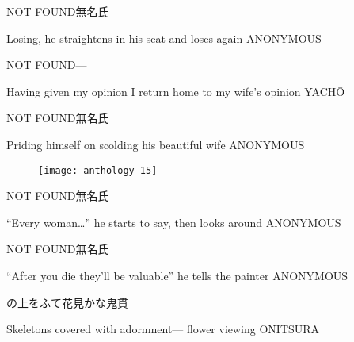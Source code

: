 \begin{haiku}
    NOT FOUND\hfill{\FH 無名氏}

    \vin{} Losing,
    \vin{} \vin{} he straightens in his seat
    \vin{} \vin{} \vin{} and loses again \hspace{\fill} ANONYMOUS
\end{haiku}

\begin{haiku}
   NOT FOUND\hfill{---}

    \vin{} Having given my opinion
    \vin{} \vin{} I return home to
    \vin{} \vin{} \vin{} my wife's opinion \hspace{\fill} YACH\={O}
\end{haiku}

\begin{haiku}
    NOT FOUND\hfill{\FH 無名氏}

    \vin{} Priding himself
    \vin{} \vin{} on scolding
    \vin{} \vin{} \vin{} his beautiful wife \hspace{\fill} ANONYMOUS
\end{haiku}

\begin{figure}
    \texttt{[image: anthology-15]}
\end{figure}

\begin{haiku}
    NOT FOUND\hfill{\FH 無名氏}

    \vin{} ``Every woman\ldots''
    \vin{} \vin{} he starts to say,
    \vin{} \vin{} \vin{} then looks around \hspace{\fill} ANONYMOUS
\end{haiku}

\begin{haiku}
    NOT FOUND\hfill{\FH 無名氏}

    \vin{} ``After you die
    \vin{} \vin{} they'll be valuable''
    \vin{} \vin{} \vin{} he tells the painter \hspace{\fill} ANONYMOUS
\end{haiku}

\begin{haiku}
    {\FH {}の上をふて花見かな}\hfill{\FH 鬼貫}

    \vin{} Skeletons
    \vin{} \vin{} covered with adornment---
    \vin{} \vin{} \vin{} flower viewing \hspace{\fill} ONITSURA
\end{haiku}

